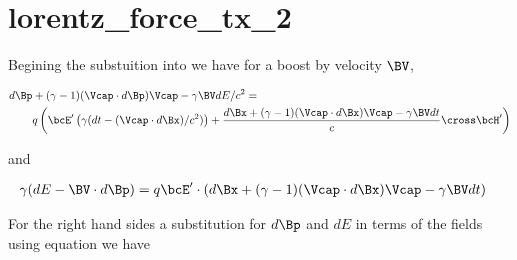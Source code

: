 %
%
%
%
%
%
%
%
\chapter{lorentz_force_tx_2}

Begining the substuition into  we have for a boost by velocity \(\BV\), 

\begin{equation}\label{eqn:lorentz_force_tx_2:20}
\begin{aligned}
d\Bp &+ (\gamma-1)(\Vcap \cdot d\Bp) \Vcap - \gamma \BV dE/c^2 = \\
&q \left( \bcE' \left(\gamma ( dt - (\Vcap \cdot d\Bx )/c^2 )\right) + \frac{d\Bx + (\gamma-1)(\Vcap \cdot d\Bx) \Vcap - \gamma \BV dt}{c} \cross \bcH' \right)  \\
\end{aligned}
\end{equation}

and

\begin{equation}\label{eqn:lorentz_force_tx_2:40}
\begin{aligned}
\gamma ( dE - \BV \cdot d\Bp ) &= q \bcE' \cdot \left(d\Bx + (\gamma-1)(\Vcap \cdot d\Bx) \Vcap - \gamma \BV dt\right)
\end{aligned}
\end{equation}

For the right hand sides a substitution for \(d\Bp\) and \(dE\) in terms of the fields using equation
 we have


